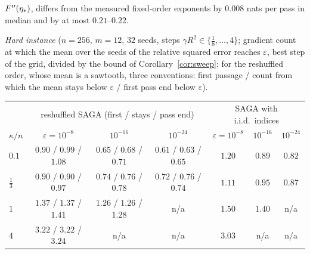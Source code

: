 $F''(\eta_\ast)$, differs from the measured fixed-order exponents by $0.008$ nats per pass in median and by at most $0.21$--$0.22$.

\emph{Hard instance} ($n=256$, $m=12$, $32$ seeds, steps $\gamma R^2\in\{\frac18,\dots,4\}$; gradient count at which the mean over the seeds of the relative squared error reaches $\varepsilon$, best step of the grid, divided by the bound of Corollary~\ref{cor:sweep}; for the reshuffled order, whose mean is a sawtooth, three conventions: first passage / count from which the mean stays below $\varepsilon$ / first pass end below $\varepsilon$).
\begin{center}
\footnotesize
\begin{tabular}{@{}lcccccc@{}}
\toprule
 & \multicolumn{3}{c}{reshuffled SAGA (first / stays / pass end)} & \multicolumn{3}{c}{SAGA with i.i.d.\ indices} \\
$\kappa/n$ & $\varepsilon=10^{-8}$ & $10^{-16}$ & $10^{-24}$ & $\varepsilon=10^{-8}$ & $10^{-16}$ & $10^{-24}$ \\
\midrule
$0.1$ & $0.90$ / $0.99$ / $1.08$ & $0.65$ / $0.68$ / $0.71$ & $0.61$ / $0.63$ / $0.65$ & $1.20$ & $0.89$ & $0.82$ \\
$\frac13$ & $0.90$ / $0.90$ / $0.97$ & $0.74$ / $0.76$ / $0.78$ & $0.72$ / $0.76$ / $0.74$ & $1.11$ & $0.95$ & $0.87$ \\
$1$ & $1.37$ / $1.37$ / $1.41$ & $1.26$ / $1.26$ / $1.28$ & n/a & $1.50$ & $1.40$ & n/a \\
$4$ & $3.22$ / $3.22$ / $3.24$ & n/a & n/a & $3.03$ & n/a & n/a \\
\bottomrule
\end{tabular}
\end{center}
